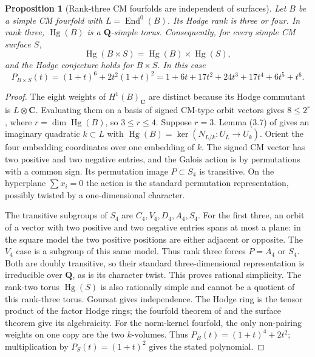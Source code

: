 \documentclass[10pt,reqno]{article}
\theoremstyle{emphasizedplain}
\newtheorem{proposition}[theorem]{Proposition}
\theoremstyle{emphasizeddefinition}
\theoremstyle{emphasizeddefinition}
\DeclareMathOperator{\End}{End}
\DeclareMathOperator{\Hg}{Hg}
\newcommand{\Q}{\mathbf Q}
\newcommand{\C}{\mathbf C}
\begin{document}
\begin{proposition}[Rank-three CM fourfolds are independent of surfaces]
\label{p:N2CMrankthree}
Let $B$ be a simple CM fourfold with $L=\End^0(B)$.
Its Hodge rank is three or four. In rank three, $\Hg(B)$ is a
$\Q$-simple torus. Consequently, for every simple CM surface $S$,
\[
 \Hg(B\times S)=\Hg(B)\times\Hg(S),
\]
and the Hodge conjecture holds for $B\times S$. In this case
\[
 P_{B\times S}(t)=(1+t)^6+2t^2(1+t)^2
 =1+6t+17t^2+24t^3+17t^4+6t^5+t^6.
\]
\end{proposition}
\begin{proof}
The eight weights of $H^1(B)_\C$ are distinct because its Hodge
commutant is $L\otimes\C$. Evaluating them on a basis of signed
CM-type orbit vectors gives $8\leq2^r$, where $r=\dim\Hg(B)$,
so $3\leq r\leq4$.
Suppose $r=3$. Lemma (3.7) of \cite{MZ} gives an imaginary
quadratic $k\subset L$ with $\Hg(B)=\ker(N_{L/k}:U_L\to U_k)$.
Orient the four embedding coordinates over one embedding of $k$.
The signed CM vector has two positive and two negative entries,
and the Galois action is by permutations with a common sign.
Its permutation image $P\subset S_4$ is transitive. On the
hyperplane $\sum x_i=0$ the action is the standard permutation
representation, possibly twisted by a one-dimensional character.

The transitive subgroups of $S_4$ are $C_4,V_4,D_4,A_4,S_4$.
For the first three, an orbit of a vector with two positive and
two negative entries spans at most a plane: in the square model
the two positive positions are either adjacent or opposite.
The $V_4$ case is a subgroup of this same model. Thus rank three
forces $P=A_4$ or $S_4$. Both are doubly transitive, so their
standard three-dimensional representation is irreducible over
$\Q$, as is its character twist. This proves rational simplicity.
The rank-two torus $\Hg(S)$ is also rationally simple and cannot
be a quotient of this rank-three torus. Goursat gives independence.
The Hodge ring is the tensor product of the factor Hodge rings;
the fourfold theorem of \cite{Markman} and the surface theorem
give its algebraicity.
For the norm-kernel fourfold, the only non-pairing weights on one
copy are the two $k$-volumes. Thus $P_B(t)=(1+t)^4+2t^2$;
multiplication by $P_S(t)=(1+t)^2$ gives the stated polynomial.
\end{proof}
\end{document}
